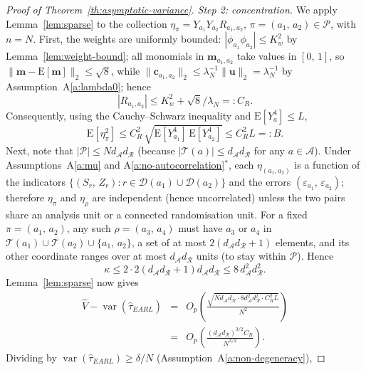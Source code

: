 \documentclass[sigconf,nonacm]{acmart}
\newcommand{\E}{\mathrm E}
\DeclareMathOperator{\var}{var}
\begin{document}
\begin{proof}[Proof of Theorem~\ref{th:asymptotic-variance}]
    \emph{Step 2: concentration.} We apply Lemma~\ref{lem:sparse} to the collection $\eta_\pi = Y_{a_1}Y_{a_2}R_{a_1,a_2}$, $\pi=(a_1,\,a_2)\in\mathcal P$, with $n=N$. First, the weights are uniformly bounded: $|\phi_{a_1}\phi_{a_2}|\le K_w^2$ by Lemma~\ref{lem:weight-bound}; all monomials in $\mathbf m_{a_1,a_2}$ take values in $[0,\,1]$, so $\|\mathbf m - \E[\mathbf m]\|_2\le \sqrt 8$, while $\|\mathbf c_{a_1,a_2}\|_2 \le \lambda_N^{-1}\|\mathbf u\|_2=\lambda_N^{-1}$ by Assumption~A\ref{a:lambda0}; hence
    \begin{equation}\label{eq:CR}
        |R_{a_1,a_2}| \le K_w^2 + \sqrt 8/\lambda_N =: C_R.
    \end{equation}
    Consequently, using the Cauchy--Schwarz inequality and $\E[Y_a^4]\le L$,
    \begin{equation*}
        \E[\eta_\pi^2] \le C_R^2\,\sqrt{\E[Y_{a_1}^4]\,\E[Y_{a_2}^4]} \le C_R^2L =: B.
    \end{equation*}
    Next, note that $|\mathcal P| \le Nd_{\mathcal A}d_{\mathcal R}$ (because $|\mathcal T(a)|\le d_{\mathcal A}d_{\mathcal R}$ for any $a\in\mathcal A$). Under Assumptions~A\ref{a:mu} and A\ref{a:no-autocorrelation}$^*$, each $\eta_{(a_1,a_2)}$ is a function of the indicators $\{(S_r,\,Z_r)\colon r\in\mathcal D(a_1)\cup\mathcal D(a_2)\}$ and the errors $(\varepsilon_{a_1},\,\varepsilon_{a_2})$; therefore $\eta_\pi$ and $\eta_\rho$ are independent (hence uncorrelated) unless the two pairs share an analysis unit or a connected randomisation unit. For a fixed $\pi=(a_1,\,a_2)$, any such $\rho=(a_3,\,a_4)$ must have $a_3$ or $a_4$ in $\mathcal T(a_1)\cup\mathcal T(a_2)\cup\{a_1,\,a_2\}$, a set of at most $2(d_{\mathcal A}d_{\mathcal R}+1)$ elements, and its other coordinate ranges over at most $d_{\mathcal A}d_{\mathcal R}$ units (to stay within $\mathcal P$). Hence
    \begin{equation*}
        \kappa \le 2\cdot 2(d_{\mathcal A}d_{\mathcal R}+1)d_{\mathcal A}d_{\mathcal R}\le 8\,d^2_{\mathcal A}d^2_{\mathcal R}.
    \end{equation*}
    Lemma~\ref{lem:sparse} now gives
    \begin{eqnarray*}
        \hat V - \var(\hat\tau^{\phantom{1}}_{EARL}) &=& O_p\left(\frac{\sqrt{Nd_{\mathcal A}d_{\mathcal R}\cdot 8d^2_{\mathcal A}d^2_{\mathcal R}\cdot C_R^2L}}{N^2}\right)\\ &=& O_p\left(\frac{(d_{\mathcal A}d_{\mathcal R})^{3/2}C_R}{N^{3/2}}\right).
    \end{eqnarray*}
    Dividing by $\var(\hat\tau_{EARL})\ge\delta/N$ (Assumption~A\ref{a:non-degeneracy}),

\end{proof}
\end{document}
